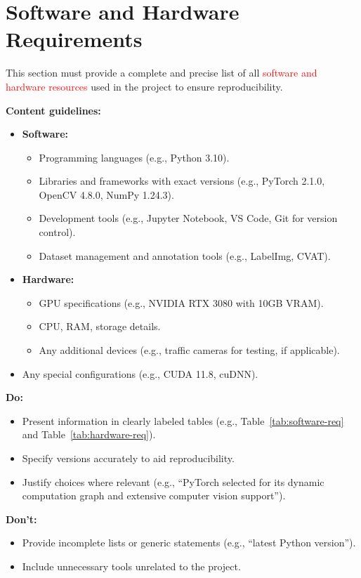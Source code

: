 \documentclass[12pt,a4paper]{report}
\theoremstyle{definition}
\theoremstyle{remark}
\begin{document}
\section{Software and Hardware Requirements}
\label{sec:requirements}

This section must provide a complete and precise list of all \textcolor{red}{software and hardware resources} used in the project to ensure reproducibility.

\noindent \textbf{Content guidelines:}
\begin{itemize}
    \item \textbf{Software:}
    \begin{itemize}
        \item Programming languages (e.g., Python 3.10).
        \item Libraries and frameworks with exact versions (e.g., PyTorch 2.1.0, OpenCV 4.8.0, NumPy 1.24.3).
        \item Development tools (e.g., Jupyter Notebook, VS Code, Git for version control).
        \item Dataset management and annotation tools (e.g., LabelImg, CVAT).
    \end{itemize}
    \item \textbf{Hardware:}
    \begin{itemize}
        \item GPU specifications (e.g., NVIDIA RTX 3080 with 10GB VRAM).
        \item CPU, RAM, storage details.
        \item Any additional devices (e.g., traffic cameras for testing, if applicable).
    \end{itemize}
    \item Any special configurations (e.g., CUDA 11.8, cuDNN).
\end{itemize}

\noindent \textbf{Do:}
\begin{itemize}
    \item Present information in clearly labeled tables (e.g., Table~\ref{tab:software-req} and Table~\ref{tab:hardware-req}).
    \item Specify versions accurately to aid reproducibility.
    \item Justify choices where relevant (e.g., ``PyTorch selected for its dynamic computation graph and extensive computer vision support'').
\end{itemize}

\noindent \textbf{Don’t:}
\begin{itemize}
    \item Provide incomplete lists or generic statements (e.g., ``latest Python version'').
    \item Include unnecessary tools unrelated to the project.
\end{itemize}
\end{document}
